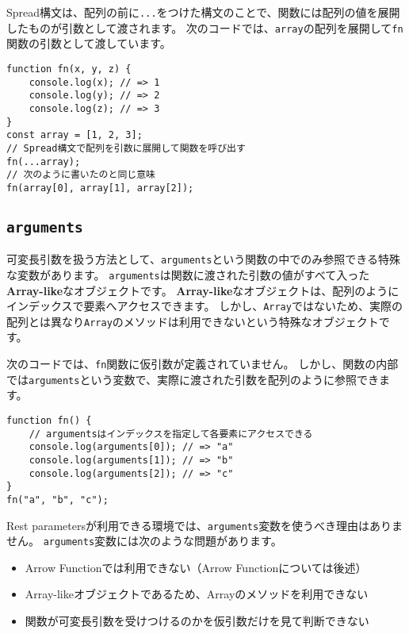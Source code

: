 Spread構文は、配列の前に\texttt{...}をつけた構文のことで、関数には配列の値を展開したものが引数として渡されます。
次のコードでは、\texttt{array}の配列を展開して\texttt{fn}関数の引数として渡しています。

\begin{lstlisting}
function fn(x, y, z) {
    console.log(x); // => 1
    console.log(y); // => 2
    console.log(z); // => 3
}
const array = [1, 2, 3];
// Spread構文で配列を引数に展開して関数を呼び出す
fn(...array);
// 次のように書いたのと同じ意味
fn(array[0], array[1], array[2]);
\end{lstlisting}

\hypertarget{arguments}{%
\subsection{\texorpdfstring{\texttt{arguments}}{arguments}}\label{arguments}}

可変長引数を扱う方法として、\texttt{arguments}という関数の中でのみ参照できる特殊な変数があります。
\texttt{arguments}は関数に渡された引数の値がすべて入った\textbf{Array-like}なオブジェクトです。
\textbf{Array-like}なオブジェクトは、配列のようにインデックスで要素へアクセスできます。
しかし、\texttt{Array}ではないため、実際の配列とは異なり\texttt{Array}のメソッドは利用できないという特殊なオブジェクトです。

次のコードでは、\texttt{fn}関数に仮引数が定義されていません。
しかし、関数の内部では\texttt{arguments}という変数で、実際に渡された引数を配列のように参照できます。

\begin{lstlisting}
function fn() {
    // argumentsはインデックスを指定して各要素にアクセスできる
    console.log(arguments[0]); // => "a"
    console.log(arguments[1]); // => "b"
    console.log(arguments[2]); // => "c"
}
fn("a", "b", "c");
\end{lstlisting}

Rest
parametersが利用できる環境では、\texttt{arguments}変数を使うべき理由はありません。
\texttt{arguments}変数には次のような問題があります。

\begin{itemize}
\item
  Arrow Functionでは利用できない（Arrow Functionについては後述）
\item
  Array-likeオブジェクトであるため、Arrayのメソッドを利用できない
\item
  関数が可変長引数を受けつけるのかを仮引数だけを見て判断できない
\end{itemize}

